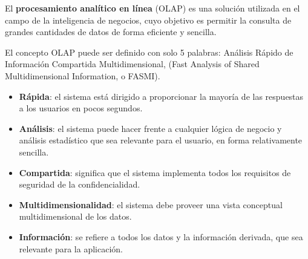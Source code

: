 \documentclass{fancyslides}
\begin{document}
\startingslide %

\begin{frame}
\end{frame}


\begin{frame}
\misc
{
El \textbf{procesamiento analítico en línea} (OLAP) es una solución utilizada en el campo de la inteligencia de negocios, cuyo objetivo es permitir la consulta de grandes cantidades de datos de forma eficiente y sencilla.
}
\end{frame}

\begin{frame}
\misc
{
El concepto OLAP puede ser definido con solo 5 palabras: Análisis Rápido de Información Compartida Multidimensional, (Fast Analysis of Shared Multidimensional Information, o FASMI).
}
\end{frame}

\begin{frame}
\misc
{
\begin{itemize}
  \item \textbf{Rápida}: el sistema está dirigido a proporcionar la mayoría de las respuestas a los usuarios en pocos segundos.
  \item \textbf{Análisis}: el sistema puede hacer frente a cualquier lógica de negocio y análisis estadístico que sea relevante para el usuario, en forma relativamente sencilla.
  \item \textbf{Compartida}: significa que el sistema implementa todos los requisitos de seguridad de la confidencialidad.
  \item \textbf{Multidimensionalidad}: el sistema debe proveer una vista conceptual multidimensional de los datos.
  \item \textbf{Información}: se refiere a todos los datos y la información derivada, que sea relevante para la aplicación.
\end{itemize}
}
\end{frame}



\begin{frame}
\end{frame}


\begin{frame}
\end{frame}
\end{document}
